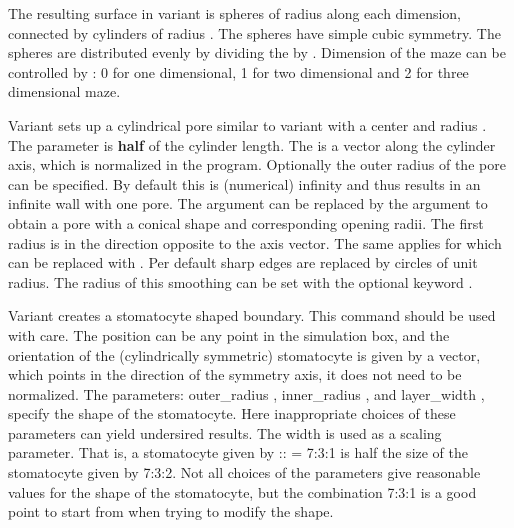 The resulting surface in variant  is 
spheres of radius  along each dimension, connected by
cylinders of radius . The spheres have simple cubic
symmetry. The spheres are distributed evenly by dividing the
 by .  Dimension of the maze can be controlled by
: 0 for one dimensional, 1 for two dimensional and 2 for three
dimensional maze.

Variant  sets up a cylindrical pore similar to variant
 with a center    and radius
. The  parameter is \textbf{half} of the cylinder
length. The  is a vector along the cylinder axis, which is
normalized in the program. Optionally the outer radius of the pore can
be specified. By default this is (numerical) infinity and thus results in 
an infinite wall with one pore. The argument  can 
be replaced by the argument  to obtain a 
pore with a conical shape and corresponding opening radii. The first radius 
is in the direction opposite to the axis vector. The same applies for 
 which can be replaced  with 
. Per default sharp edges are
replaced by circles of unit radius. The radius of this smoothing can be set
with the optional keyword .


Variant  creates a stomatocyte shaped boundary. This command
should be used with care. The position can be any point in the simulation
box, and the orientation of the (cylindrically symmetric) stomatocyte is
given by a vector, which points in the direction of the symmetry axis, it
does not need to be normalized. The parameters: outer_radius ,
inner_radius , and layer_width , specify the shape of the
stomatocyte. Here inappropriate choices of these parameters can yield 
undersired results. The width is used as a scaling parameter. That is,
a stomatocyte given by :: = 7:3:1 is half the size
of the stomatocyte given by 7:3:2. Not all choices of the parameters give
reasonable values for the shape of the stomatocyte, but the combination
7:3:1 is a good point to start from when trying to modify the shape. 


